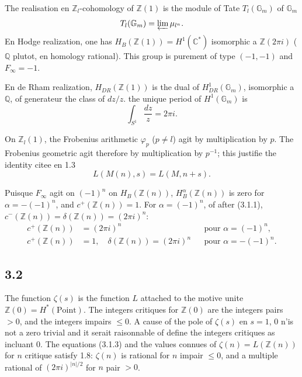 \documentclass[12pt,a4paper]{article}
\theoremstyle{plain}
\theoremstyle{definition}
\theoremstyle{remark}
\newcommand{\Q}{\mathbb{Q}}
\newcommand{\C}{\mathbb{C}}
\newcommand{\Z}{\mathbb{Z}}
\begin{document}
The realisation en $\Z_l$-cohomology of $\Z(1)$ is the module of Tate $T_l(\mathbb{G}_m)$ of
$\mathbb{G}_m$
\[
T_l(\mathbb{G}_m) = \varprojlim \mu_{l^n}.
\]
En Hodge realization, one has $H_B(\Z(1)) = H^1(\C^*)$ isomorphic a $\Z(2\pi i)$ ($\Q$
plutot, en homology rational). This group is purement of type $(-1,-1)$ and
$F_\infty = -1$.

En de Rham realization, $H_{DR}(\Z(1))$ is the dual of $H^1_{DR}(\mathbb{G}_m)$, isomorphic a
$\Q$, of generateur the class of $dz/z$. the unique period of $H^1(\mathbb{G}_m)$ is
\begin{equation}\label{eq:3.1.1}
\int_{S^1} \frac{dz}{z} = 2\pi i.
\end{equation}

On $\Z_l(1)$, the Frobenius arithmetic $\varphi_p$ ($p \neq l$) agit by multiplication by $p$. The
Frobenius geometric agit therefore by multiplication by $p^{-1}$; this justifie the identity
citee en 1.3
\begin{equation}\label{eq:3.1.2}
L(M(n), s) = L(M, n+s).
\end{equation}

Puisque $F_\infty$ agit on $(-1)^n$ on $H_B(\Z(n))$, $H^\alpha_B(\Z(n))$ is zero for
$\alpha = -(-1)^n$, and $c^+(\Z(n)) = 1$. For $\alpha = (-1)^n$, of after (3.1.1),
$c^-(\Z(n)) = \delta(\Z(n)) = (2\pi i)^n$:
\begin{equation}\label{eq:3.1.3}
\begin{aligned}
c^+(\Z(n)) &= (2\pi i)^n &&\text{pour } \alpha = (-1)^n,\\
c^+(\Z(n)) &= 1, \quad \delta(\Z(n)) = (2\pi i)^n &&\text{pour } \alpha = -(-1)^n.
\end{aligned}
\end{equation}

\subsection*{3.2}

The function $\zeta(s)$ is the function $L$ attached to the motive unite $\Z(0) = H^*(\text{Point})$.
The integers critiques for $\Z(0)$ are the integers pairs $> 0$, and the integers impairs
$\leq 0$. A cause of the pole of $\zeta(s)$ en $s = 1$, $0$ n'is not a zero trivial and it serait
raisonnable of define the integers critiques as incluant $0$. The equations (3.1.3)
and the values connues of $\zeta(n) = L(\Z(n))$ for $n$ critique satisfy 1.8:
$\zeta(n)$ is rational for $n$ impair $\leq 0$, and a multiple rational of $(2\pi i)^{|n|/2}$
for $n$ pair $> 0$.
\end{document}
